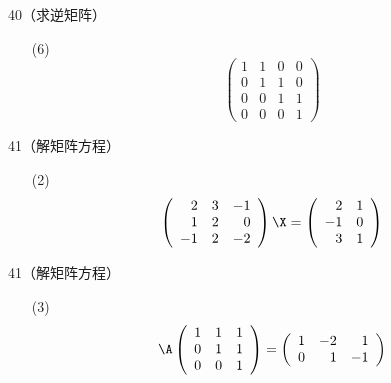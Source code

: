 \begin{frame}
  \begin{footnotesize}
    \begin{exampleblock}{40（求逆矩阵）}
      \begin{itemize}
      \item[(6)]
        $$
        \left(
        \begin{array}{rrrr}
          1&1&0&0\\
          0&1&1&0\\
          0&0&1&1\\
          0&0&0&1
        \end{array}
        \right)
        $$
      \end{itemize}
    \end{exampleblock}
  \end{footnotesize}
\end{frame}


\begin{frame}
  \begin{footnotesize}
    \begin{exampleblock}{41（解矩阵方程）}
      \begin{itemize}
      \item[(2)]
        $$
        \left(
        \begin{array}{rrr}
          2&3&-1\\
          1&2&0\\
          -1&2&-2
        \end{array}
        \right)\X=
        \left(
        \begin{array}{rr}
          2&1\\
          -1&0\\
          3&1
        \end{array}
        \right)        
        $$
      \end{itemize}
    \end{exampleblock}
  \end{footnotesize}
\end{frame}

\begin{frame}
  \begin{footnotesize}
    \begin{exampleblock}{41（解矩阵方程）}
      \begin{itemize}
      \item[(3)]
        $$
        \A\left(
        \begin{array}{rrr}
          1&1&1\\
          0&1&1\\
          0&0&1
        \end{array}
        \right)=
        \left(
        \begin{array}{rrr}
          1&-2&1\\
          0&1&-1
        \end{array}
        \right)        
        $$
      \end{itemize}
    \end{exampleblock}
  \end{footnotesize}
\end{frame}


